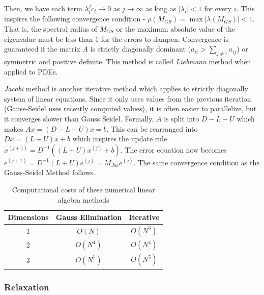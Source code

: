 \documentclass[12pt]{article}
\begin{document}
Then, we have each term $\lambda_i^jc_i \to 0$ as $j \to \infty$ as long as $|\lambda_i| < 1$ for every $i$. This inspires the following convergence condition -  $\rho(M_{GS}) = \max |\lambda(M_{GS})| < 1$. That is, the spectral radius of $M_{GS}$ or the maximum absolute value of the eigenvalue must be less than $1$ for the errors to dampen. Convergence is guaranteed if the matrix $A$ is strictly diagonally dominant ($a_{ii} > \sum_{j\neq i} a_{ij}$) or symmetric and positive definite.  This method is called \textit{Liebmann} method when applied to PDEs. 

\textit{Jacobi} method is another iterative method which applies to strictly diagonally system of linear equations. Since it only uses values from the previous iteration (Gauss-Seidel uses recently computed values), it is often easier to parallelize, but it converges slower than Gauss Seidel. Formally, $A$ is split into $D - L - U$ which makes $Ax = (D - L - U)x = b$. This can be rearranged into $Dx = (L + U)x + b$ which inspires the update rule $x^{(j + 1)} = D^{-1}\left((L + U)x^{(j)} + b\right)$. The error equation now becomes 
$e^{(j + 1)} = D^{-1}(L + U)e^{(j)} = M_{Jac}e^{(j)}$. The same convergence condition as the Gauss-Seidel Method follows. 


\begin{table}[h]
    \centering
    \begin{tabular}{|c|c|c|}
    \hline
        Dimensions & Gauss Elimination & Iterative \\
        \hline
         1& $O(N)$ & $O(N^3)$  \\
         2& $O(N^4)$ & $O(N^4)$  \\
         3& $O(N^7)$ & $O(N^5)$  \\
         \hline
    \end{tabular}
    \caption{Computational costs of these numerical linear algebra methods}
    \label{tab:compcost}
\end{table}


\subsubsection{Relaxation}
\end{document}
